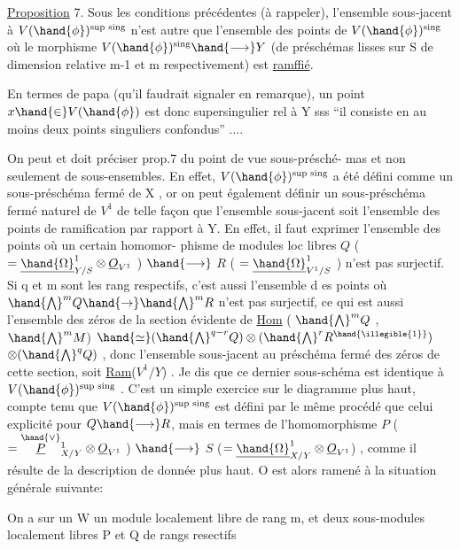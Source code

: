 
\uline{Proposition} 7. Sous les conditions précédentes (à rappeler), l'ensemble
sous-jacent à $V(\hand{\phi})^{\text{sup sing}}$ n'est autre que l'ensemble des points de
$V(\hand{\phi})^{\text{sing}}$  où le morphisme $V(\hand{\phi})^{\text{sing}}\hand{\longrightarrow} Y$ (de préschémas lisses
sur S de dimension relative m-1 et m respectivement) est \uline{ramffié}.

En termes de papa (qu'il faudrait signaler en remarque), un point
$x \hand{\in} V(\hand{\phi})$ est donc supersingulier rel à Y sss ``il consiste en au
moins deux points singuliers confondus'' ....

On peut et doit préciser prop.7 du point de vue   sous-présché-%
mas et non seulement de sous-ensembles. En effet, $V(\hand{\phi})^{\text{sup sing}}$ a été
défini comme un sous-préschéma fermé de X , or on peut également définir
un sous-préschéma fermé naturel de $V^1$ de telle façon que l'ensemble
sous-jacent soit l'ensemble des points de ramification par rapport à Y.
En effet, il faut exprimer l'ensemble des points où un certain homomor-%
phisme de modules loc libres $Q$ ( $=\underline{\hand{\Omega}}^1_{Y/S}\otimes\underline{O}_{V^1}$ ) $\hand{\longrightarrow}$ $R$ ( $=\underline{\hand{\Omega}}^1_{V^1/S}$ )
n'est pas surjectif. Si q et m sont les rang respectifs, c'est aussi
l'ensemble d es points où $\hand{\bigwedge}^{m} Q \hand{\rightarrow} \hand{\bigwedge}^{m} R$ n'est pas surjectif, ce qui est
aussi l'ensemble des zéros de la section évidente de \uline{Hom} ( $\hand{\bigwedge}^{m} Q$ , $\hand{\bigwedge}^{m} M$)
$\hand{\simeq} (\hand{\bigwedge}^{q-r} Q)\otimes(\hand{\bigwedge}^{r} R^{\hand{\illegible{1}}})$$\otimes(\hand{\bigwedge}^{q} Q)$\hand{$^{\vee}$} , donc l'ensemble sous-jacent au préschéma
fermé des zéros de cette section, soit \uline{Ram}($V^1/Y$) . Je dis que ce dernier
sous-schéma est identique à $V(\hand{\phi})^{\text{sup sing}}$ . C'est un simple exercice
sur le diagramme plus haut, compte tenu que $V(\hand{\phi})^{\text{sup sing}}$ est défini
par le même procédé que celui explicité pour $Q\hand{\longrightarrow} R$, mais en termes de
l'homomorphisme $P$ ( $= \overset{\hand{\vee}}{\underline{P}}{}^1_{X/Y}\otimes\underline{O}_{V^1}$ ) $\hand{\longrightarrow}$ $S$ ($=\underline{\hand{\Omega}}^1_{X/Y}\otimes\underline{O}_{V^1}$) , comme
il résulte de la description de \hand{$\mu$} donnée plus haut. O est alors
ramené à la situation générale suivante:

On a sur un   W un module localement libre  de rang m,
et deux sous-modules localement libres P et Q de rangs resectifs

